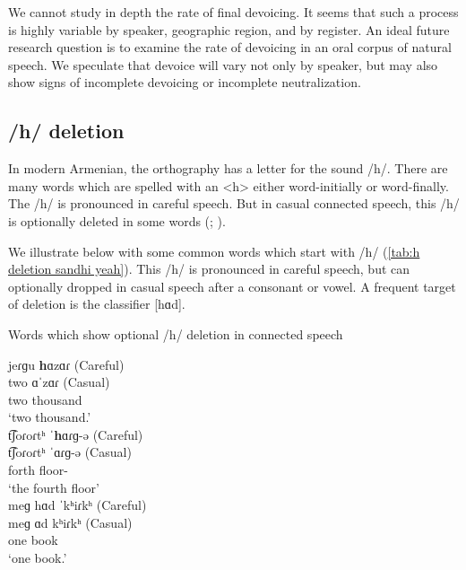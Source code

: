   	
  	We cannot study in depth the rate of final devoicing. It seems that such a process is highly variable by speaker, geographic region, and by register. An ideal future research question is to examine the rate of devoicing in an oral corpus of natural speech. We speculate that devoice will vary not only by speaker, but may also show signs of incomplete devoicing or incomplete neutralization. 
  	
  	
  	\subsection{/h/ deletion}\label{section:segmentalPhono:sandhi:HDeletion}
  	In modern Armenian, the orthography has a letter  for the sound /h/. There are many words which are spelled with an <h> either word-initially or word-finally. The /h/ is pronounced in careful speech. But in casual connected speech, this /h/ is optionally deleted in some words (\citealt[162]{Gharagulyan-1974-BookArmenianOrthoepy}; \citealt[64]{Margaryan-1997-ArmenianPhonology}). 
  	
  	We illustrate below with some common words which start with /h/ (\ref{tab:h deletion sandhi yeah}). This /h/ is pronounced in careful speech, but can optionally dropped in casual speech after a consonant or vowel. A frequent target of deletion is the classifier [hɑd]. 
  	
  	\begin{exe}
    \ex Words which show optional /h/ deletion in connected speech \label{tab:h deletion sandhi yeah}
    \begin{xlist}
    	\ex \glll jeɾɡu \textbf{h}ɑzɑɾ (Careful)
    	\\
    	two ɑˈzɑɾ (Casual)
    	\\
    	two thousand 
    	\\
    	\trans `two thousand.' 
    	\\
    	\ex \glll t͡ʃoɾoɾtʰ ˈ\textbf{h}ɑɾɡ-ə (Careful)
    	\\
    	t͡ʃoɾoɾtʰ ˈɑɾɡ-ə (Casual)
    	\\
    	forth floor-{} 
    	\\
    	\trans `the fourth floor'
    	\\
    	\ex \glll meɡ hɑd ˈkʰiɾkʰ (Careful)
    	\\
    	meɡ ɑd kʰiɾkʰ (Casual)
    	\\
    	one {\clf} book 
    	\\
    	\trans `one book.'
    	\\
    \end{xlist}
  	\end{exe}
  	
